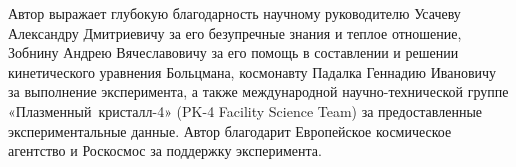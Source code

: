 \Acknowledgements %
Автор выражает глубокую благодарность научному
руководителю Усачеву Александру Дмитриевичу за его безупречные знания и теплое отношение,
Зобнину Андрею Вячеславовичу за его помощь в составлении и решении
кинетического уравнения Больцмана, космонавту Падалка Геннадию Ивановичу за
выполнение эксперимента, а также международной научно-технической группе
«Плазменный~кристалл-4» (PK-4 Facility Science Team) за предоставленные
экспериментальные данные. Автор благодарит Европейское космическое
агентство и Роскосмос за поддержку эксперимента.